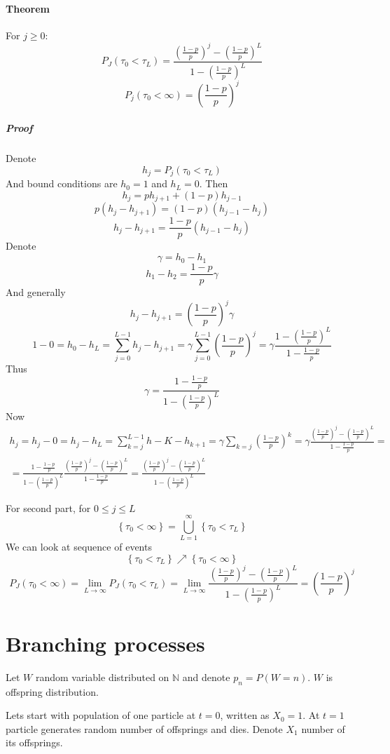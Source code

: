 \paragraph{Theorem}
For $j \geq 0$:
$$P_J\left( \tau_0 < \tau_L \right) = \frac{\left( \frac{1-p}{p} \right)^j - \left( \frac{1-p}{p} \right)^L}{1 - \left( \frac{1-p}{p} \right)^L}$$
$$P_j(\tau_0 < \infty) = \left( \frac{1-p}{p} \right)^j$$
\subparagraph{Proof}
Denote
$$h_j = P_j(\tau_{0} < \tau_L)$$
And bound conditions are $h_0=1$ and $h_L = 0$.
Then 
$$h_j = ph_{j+1} + (1-p) h_{j-1}$$
$$p\left(h_j - h_{j+1}\right)= (1-p) \left(h_{j-1} - h_{j}\right)$$
$$h_j - h_{j+1}= \frac{1-p}{p}  \left(h_{j-1} - h_{j}\right)$$
Denote 
$$\gamma = h_0-h_1$$
$$ h_1-h_2 = \frac{1-p}{p} \gamma $$
And generally
$$h_j-h_{j+1} = \left(\frac{1-p}{p}\right)^j \gamma $$
$$1-0= h_0-h_L = \sum_{j=0}^{L-1} h_j - h_{j+1} = \gamma\sum_{j=0}^{L-1} \left(\frac{1-p}{p}\right)^j = \gamma \frac{1 - \left(\frac{1-p}{p}\right)^L}{1- \frac{1-p}{p}}$$
Thus
$$\gamma = \frac{1- \frac{1-p}{p}}{1 - \left(\frac{1-p}{p}\right)^L}$$
Now
\begin{align*}
h_j = h_j - 0 = h_j - h_L = \sum_{k=j}^{L-1} h-K - h_{k+1} = \gamma \sum_{k=j} \left(\frac{1-p}{p}\right)^k  = \gamma \frac{\left(\frac{1-p}{p}\right)^j - \left(\frac{1-p}{p}\right)^L}{1- \frac{1-p}{p}}  =\\= \frac{1- \frac{1-p}{p}}{1 - \left(\frac{1-p}{p}\right)^L} \frac{\left(\frac{1-p}{p}\right)^j - \left(\frac{1-p}{p}\right)^L}{1- \frac{1-p}{p}} = \frac{\left(\frac{1-p}{p}\right)^j - \left(\frac{1-p}{p}\right)^L}{1 - \left(\frac{1-p}{p}\right)^L} 
\end{align*}

For second part, for $ 0 \leq j \leq L$
$$\left\{ \tau_0 < \infty \right\} = \bigcup_{L=1}^\infty \left\{ \tau_0 < \tau_L \right\}$$
We can look at sequence of events 
$$\left\{ \tau_0 < \tau_{L} \right\} \nearrow \left\{ \tau_0 < \infty \right\} $$
$$P_J \left( \tau_0 < \infty \right) = \lim_{L\to \infty} P_J \left( \tau_0 < \tau_L \right) = \lim_{L\to \infty} \frac{\left( \frac{1-p}{p} \right)^j - \left( \frac{1-p}{p} \right)^L}{1 - \left( \frac{1-p}{p} \right)^L} = \left( \frac{1-p}{p} \right)^j$$
\section{Branching processes}
Let $W$ random variable distributed on $\mathbb{N}$ and denote $p_n = P(W = n)$. $W$ is offspring distribution.

Lets start with population of one particle at $t=0$, written as $X_0=1$. At $t=1$ particle generates random number of offsprings and dies. Denote $X_1$ number of its offsprings.

